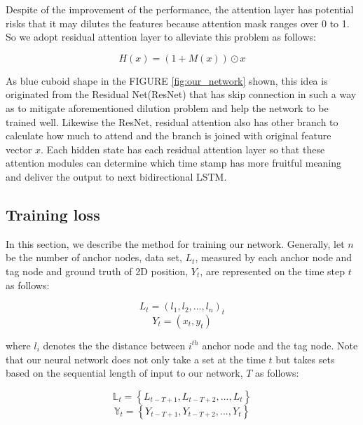 \documentclass[letterpaper, 10 pt, conference]{ieeeconf}  %
\begin{document}
Despite of the improvement of the performance, the attention layer has potential risks that it may dilutes the features because attention mask ranges over 0 to 1. So we adopt residual attention layer to alleviate this problem as follows\cite{wang2017residual}:

\begin{equation}
H(x)=\left(1+M(x)\right)\odot x
\end{equation} 

As blue cuboid shape in the FIGURE \ref{fig:our_network} shown, this idea is originated from the Residual Net(ResNet)\cite{he2016deep} that has skip connection in such a way as to mitigate aforementioned dilution problem and help the network to be trained well. Likewise the ResNet, residual attention also has other branch to calculate how much to attend and the branch is joined with original feature vector $x$. Each hidden state has each residual attention layer so that these attention modules can determine which time stamp has more fruitful meaning and deliver the output to next bidirectional LSTM.

\subsection{Training loss}

In this section, we describe the method for training our network. Generally, let $n$ be the number of anchor nodes, data set, $L_{t}$, measured by each anchor node and tag node and ground truth of 2D position, $Y_t$, are represented on the time step $t$ as follows:

\begin{equation}
L_{t} = (l_{1}, l_{2}, ..., l_{n})_{t}
\end{equation}
\begin{equation}
Y_t = (x_t, y_t)
\end{equation}

where $l_{i}$ denotes the the distance between $i^{th}$ anchor node and the tag node. Note that our neural network does not only take a set at the time $t$ but takes sets based on the sequential length of input to our network, $T$ as follows:

\begin{equation}
\mathbb{L}_t = \left\{L_{t-T+1}, L_{t-T+2}, ..., L_t\right\} 
\end{equation}
\begin{equation}
\mathbb{Y}_t = \left\{Y_{t-T+1}, Y_{t-T+2}, ..., Y_t\right\}
\end{equation}
\end{document}
